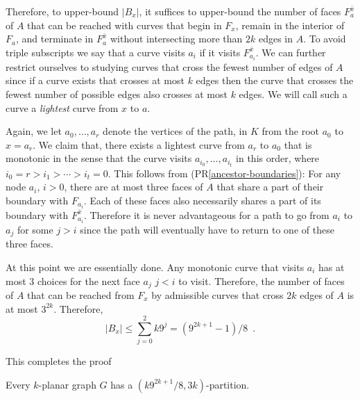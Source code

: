 \documentclass{patmorin}
\begin{document}
Therefore, to upper-bound $|B_x|$, it suffices to upper-bound the number of faces $F^{\bar{x}}_a$ of $A$ that can be reached with curves that begin in $F_x$, remain in the interior of $F_a$, and terminate in $F^{\bar{x}}_a$ without intersecting more than $2k$ edges in $A$.  To avoid triple subscripts we say that a curve visits $a_i$ if it visits $F^{\bar{x}}_{a_i}$.  We can further restrict ourselves to studying curves that cross the fewest number of edges of $A$ since if a curve exists that crosses at most $k$ edges then the curve that crosses the fewest number of possible edges also crosses at most $k$ edges.  We will call such a curve a \emph{lightest} curve from $x$ to $a$.

Again, we let $a_0,\ldots,a_r$ denote the vertices of the path, in $K$ from the root $a_0$ to $x=a_r$.  We claim that, there exists a lightest curve from $a_r$ to $a_0$ that is monotonic in the sense that the curve visits $a_{i_0},\ldots,a_{i_t}$ in this order, where $i_0=r > i_1>\cdots>i_t=0$.
This follows from (PR\ref{ancestor-boundaries}):  For any node $a_i$, $i>0$, there are at most three faces of $A$ that share a part of their boundary with $F_{a_i}$.  Each of these faces also necessarily shares a part of its boundary with $F^{\bar{x}}_{a_i}$.  Therefore it is never advantageous for a path to go from $a_i$ to $a_j$ for some $j>i$ since the path will eventually have to return to one of these three faces.

At this point we are essentially done.  Any monotonic curve that visits $a_i$ has at most 3 choices for the next face $a_j$ $j<i$ to visit.  Therefore, the number of faces of $A$ that can be reached from $F_x$ by admissible curves that cross $2k$ edges of $A$ is at most $3^{2k}$. Therefore,
\[
   |B_x| \le \sum_{j=0}^2k 9^j = (9^{2k+1}-1)/8 \enspace .
\]

This completes the proof

\begin{thm}
    Every $k$-planar graph $G$ has a $(k9^{2k+1}/8,3k)$-partition.
\end{thm}



\end{document}
